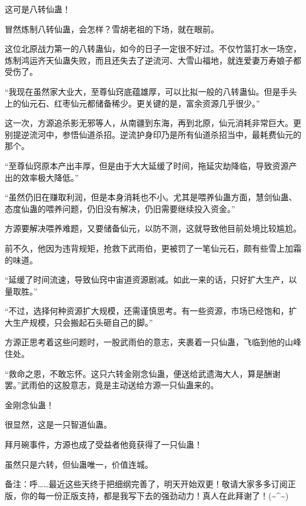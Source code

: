 \begin{this_body}
这可是八转仙蛊！

冒然炼制八转仙蛊，会怎样？雪胡老祖的下场，就在眼前。

这位北原战力第一的八转蛊仙，如今的日子一定很不好过。不仅竹篮打水一场空，炼制鸿运齐天仙蛊失败，而且还失去了逆流河、大雪山福地，就连爱妻万寿娘子都受伤了。

“我现在虽然家大业大，至尊仙窍底蕴雄厚，可以比拟一般的八转蛊仙。但是手头上的仙元石、红枣仙元都储备稀少。更关键的是，富余资源几乎很少。”

这一次，方源追杀影无邪等人，从南疆到东海，再到北原，仙元消耗非常巨大。更别提逆流河中，参悟仙道杀招。逆流护身印乃是所有仙道杀招当中，最耗费仙元的那个。

“至尊仙窍原本产出丰厚，但是由于大大延缓了时间，拖延灾劫降临，导致资源产出的效率极大降低。”

“虽然仍旧在赚取利润，但是本身消耗也不小。尤其是喂养仙蛊方面，慧剑仙蛊、态度仙蛊的喂养问题，仍旧没有解决，仍旧需要继续投入资金。”

方源要解决喂养难题，又要储备仙元，以防不测，这就导致他目前处境比较尴尬。

前不久，他因为违背规矩，抢救下武雨伯，更被罚了一笔仙元石，颇有些雪上加霜的味道。

“延缓了时间流速，导致仙窍中宙道资源剧减。如此一来的话，只好扩大生产，以量取胜。”

“不过，选择何种资源扩大规模，还需谨慎思考。有一些资源，市场已经饱和，扩大生产规模，只会搬起石头砸自己的脚。”

方源正思考着这些问题时，一股武雨伯的意志，夹裹着一只仙蛊，飞临到他的山峰住处。

“救命之恩，不敢忘怀。这只六转金刚念仙蛊，便送给武遗海大人，算是酬谢罢。”武雨伯的这股意志，竟是主动送给方源一只仙蛊来的。

金刚念仙蛊！

很显然，这是一只智道仙蛊。

拜月碗事件，方源也成了受益者他竟获得了一只仙蛊！

虽然只是六转，但仙蛊唯一，价值连城。

备注：呼……最近这些天终于把细纲完善了，明天开始双更！敬请大家多多订阅正版，你的每一份正版支持，都是我写下去的强劲动力！真人在此拜谢了！(\~{}\^{}\~{})

\end{this_body}

